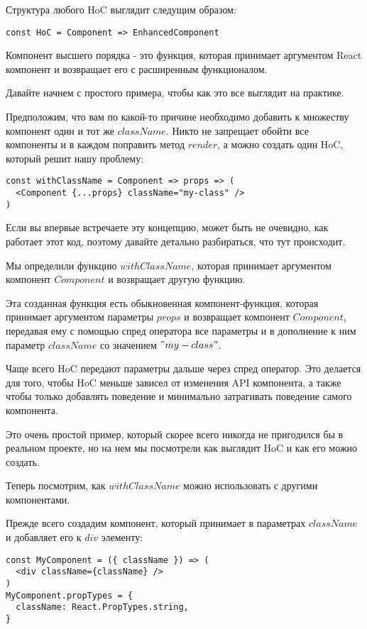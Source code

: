 Структура любого HoC выглядит следущим образом:

\begin{lstlisting}
const HoC = Component => EnhancedComponent
\end{lstlisting}

Компонент высшего порядка - это функция, которая принимает аргументом React компонент и возвращает его с расширенным функционалом.

Давайте начнем с простого примера, чтобы как это все выглядит на практике.

Предположим, что вам по какой-то причине необходимо добавить к множеству компонент один и тот же $className$. Никто не запрещает обойти все компоненты и в каждом поправить метод $render$, а можно создать один HoC, который решит нашу проблему:

\begin{lstlisting}
const withClassName = Component => props => (
  <Component {...props} className="my-class" />
)
\end{lstlisting}

Если вы впервые встречаете эту концепцию, может быть не очевидно, как работает этот код, поэтому давайте детально разбираться, что тут происходит.

Мы определили функцию $withClassName$, которая принимает аргументом компонент $Component$ и возвращает другую функцию.

Эта созданная функция есть обыкновенная компонент-функция, которая принимает аргументом параметры $props$ и возвращает компонент $Component$, передавая ему с помощью спред оператора все параметры и в дополнение к ним параметр $className$ со значением $"my-class"$. 

Чаще всего HoC передают параметры дальше через спред оператор. Это делается для того, чтобы HoC меньше зависел от изменения API компонента, а также чтобы только добавлять поведение и минимально затрагивать поведение самого компонента.

Это очень простой пример, который скорее всего никогда не пригодился бы в реальном проекте, но на нем мы посмотрели как выглядит HoC и как его можно создать.

Теперь посмотрим, как $withClassName$ можно использовать с другими компонентами.

Прежде всего создадим компонент, который принимает в параметрах $className$ и добавляет его к $div$ элементу:

\begin{lstlisting}
const MyComponent = ({ className }) => (
  <div className={className} />
)
MyComponent.propTypes = {
  className: React.PropTypes.string,
}
\end{lstlisting}

